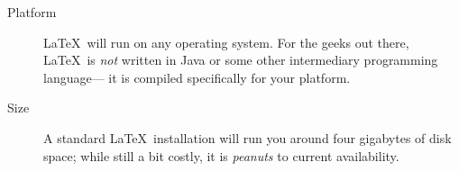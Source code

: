 \begin{description}
\item[Platform]
  \LaTeX\ will run on any operating system.
  For the geeks out there, \LaTeX\ is \emph{not} written in Java
    or some other intermediary programming language---%
    it is compiled specifically for your platform.
\item[Size]
  A standard \LaTeX\ installation will run you around four gigabytes of disk space;
  while still a bit costly, it is \emph{peanuts} to current availability.
\end{description}

